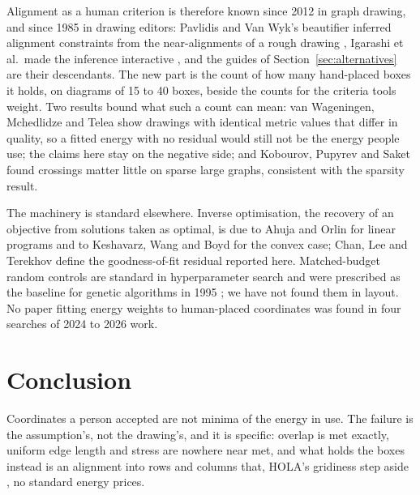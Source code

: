 \documentclass[11pt]{article}
\begin{document}
Alignment as a human criterion is therefore known since 2012 in graph drawing, and since
1985 in drawing editors: Pavlidis and Van Wyk's beautifier inferred alignment constraints
from the near-alignments of a rough drawing \cite{pvw85}, Igarashi et al.\ made the
inference interactive \cite{igarashi97}, and the guides of
Section~\ref{sec:alternatives} are their descendants. The new part is the count
of how many hand-placed boxes it holds, on diagrams of 15 to 40 boxes, beside the counts for
the criteria tools weight. Two results bound what such a count can mean: van Wageningen,
Mchedlidze and Telea \cite{wageningen25} show drawings with identical metric values that
differ in quality, so a fitted energy with no residual would still not be the energy people
use; the claims here stay on the negative side; and Kobourov, Pupyrev and Saket
\cite{kobourov14} found crossings matter little on sparse large graphs, consistent with the
sparsity result.

The machinery is standard elsewhere. Inverse optimisation, the recovery of an objective from
solutions taken as optimal, is due to Ahuja and Orlin \cite{ahuja01} for linear programs and
to Keshavarz, Wang and Boyd \cite{keshavarz11} for the convex case; Chan, Lee and Terekhov
\cite{chan19} define the goodness-of-fit residual reported here. Matched-budget random
controls are standard in hyperparameter search \cite{bergstra12} and were prescribed as the
baseline for genetic algorithms in 1995 \cite{jw95}; we have not found them in layout. No
paper fitting energy weights to human-placed coordinates was found in four searches of 2024
to 2026 work.


\section{Conclusion}


Coordinates a person accepted are not minima of the energy in use. The failure is the
assumption's, not the drawing's, and it is specific: overlap is met exactly, uniform
edge length and stress are nowhere near met, and what holds the boxes instead is an
alignment into rows and columns that, HOLA's gridiness step aside \cite{hola16}, no
standard energy prices.
\end{document}
